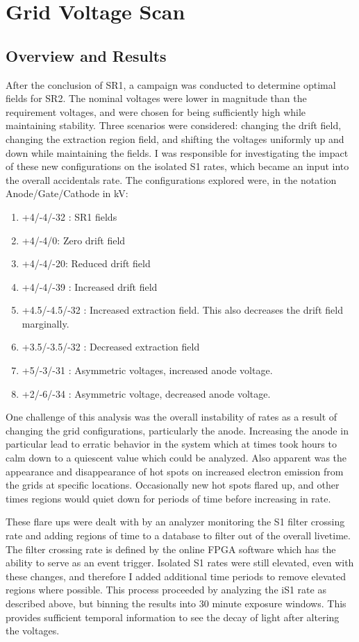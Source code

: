 \section{Grid Voltage Scan}
\label{sec:grid_scan}
\subsection{Overview and Results}
After the conclusion of SR1, a campaign was conducted to determine optimal fields for SR2.
The nominal voltages were lower in magnitude than the requirement voltages, and were chosen for being sufficiently high while maintaining stability.
Three scenarios were considered: changing the drift field, changing the extraction region field, and shifting the voltages uniformly up and down while maintaining the fields.
I was responsible for investigating the impact of these new configurations on the isolated S1 rates, which became an input into the overall accidentals rate.
The configurations explored were, in the notation Anode/Gate/Cathode in kV:
\begin{enumerate}
    \item +4/-4/-32 : SR1 fields
    \item +4/-4/0: Zero drift field
    \item +4/-4/-20: Reduced drift field
    \item +4/-4/-39 : Increased drift field
    \item +4.5/-4.5/-32 : Increased extraction field. This also decreases the drift field marginally.
    \item +3.5/-3.5/-32 : Decreased extraction field
    \item +5/-3/-31 : Asymmetric voltages, increased anode voltage.
    \item +2/-6/-34 : Asymmetric voltage, decreased anode voltage.
\end{enumerate}


One challenge of this analysis was the overall instability of rates as a result of changing the grid configurations, particularly the anode.
Increasing the anode in particular lead to erratic behavior in the system which at times took hours to calm down to a quiescent value which could be analyzed.
Also apparent was the appearance and disappearance of hot spots on increased electron emission from the grids at specific locations.
Occasionally new hot spots flared up, and other times regions would quiet down for periods of time before increasing in rate.

These flare ups were dealt with by an analyzer monitoring the S1 filter crossing rate and adding regions of time to a database to filter out of the overall livetime.
The filter crossing rate is defined by the online FPGA software which has the ability to serve as an event trigger.
Isolated S1 rates were still elevated, even with these changes, and therefore I added additional time periods to remove elevated regions where possible.
This process proceeded by analyzing the iS1 rate as described above, but binning the results into 30 minute exposure windows.
This provides sufficient temporal information to see the decay of light after altering the voltages.

